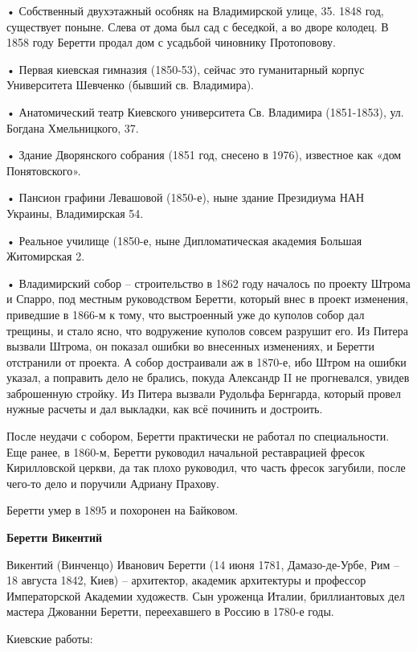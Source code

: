 \noindent • Собственный двухэтажный особняк на Владимирской улице, 35. 1848 год, существует поныне. Слева от дома был сад с беседкой, а во дворе колодец. В 1858 году Беретти продал дом с усадьбой чиновнику Протоповову.

\noindent • Первая киевская гимназия (1850-53), сейчас  это гуманитарный корпус Университета Шевченко (бывший св. Владимира).

\noindent • Анатомический театр Киевского университета Св. Владимира (1851-1853), ул. Богдана Хмельницкого, 37.

\noindent • Здание Дворянского собрания (1851 год, снесено в 1976), известное как «дом Понятовского».

\noindent • Пансион графини Левашовой (1850-е), ныне здание Президиума НАН Украины, Владимирская 54.

\noindent • Реальное училище (1850-е, ныне Дипломатическая академия Большая Житомирская 2.

\noindent • Владимирский собор – строительство в 1862 году началось по проекту Штрома и Спарро, под местным руководством Беретти, который внес в проект изменения, приведшие в 1866-м к тому, что выстроенный уже до куполов собор дал трещины, и стало ясно, что водружение куполов совсем разрушит его. Из Питера вызвали Штрома, он показал ошибки во внесенных изменениях, и Беретти отстранили от проекта. А собор достраивали аж в 1870-е, ибо Штром на ошибки указал, а поправить дело не брались, покуда Александр II не прогневался, увидев заброшенную стройку. Из Питера вызвали Рудольфа Бернгарда, который провел нужные расчеты и дал выкладки, как всё починить и достроить. 

После неудачи с собором, Беретти практически не работал по специальности. Еще ранее, в 1860-м, Беретти руководил начальной реставрацией фресок Кирилловской церкви, да так плохо руководил, что часть фресок загубили, после чего-то дело и поручили Адриану Прахову.

Беретти умер в 1895 и похоронен на Байковом.\\

\medskip

\textbf{Беретти Викентий}

Викентий (Винченцо) Иванович Беретти (14 июня 1781, Дамазо-де-Урбе, Рим – 18 августа 1842, Киев) – архитектор, академик архитектуры и профессор Императорской Академии художеств. Сын уроженца Италии, бриллиантовых дел мастера Джованни Беретти, переехавшего в Россию в 1780-е годы.

Киевские работы:

